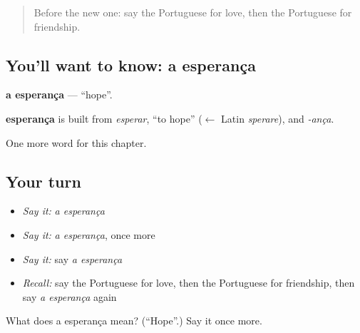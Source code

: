 \label{lesson:PT-C149-esperanca}



\begin{quote}
Before the new one: say the Portuguese for love, then the Portuguese for friendship.
\end{quote}

\subsection*{You'll want to know: a esperança}
\textbf{a esperança} — \textquotedblleft{}hope\textquotedblright{}.

\begin{cousinweb}
\textbf{esperança} is built from \emph{esperar}, \textquotedblleft{}to hope\textquotedblright{} ($\leftarrow$ Latin \emph{sperare}), and \emph{-ança}.
\end{cousinweb}

\begin{grammarlens}[title={What you've built}]
One more word for this chapter.
\end{grammarlens}

\subsection*{Your turn}
\begin{itemize}
\raggedright
  \item \emph{Say it:} \emph{a esperança}
  \item \emph{Say it:} \emph{a esperança}, once more
  \item \emph{Say it:} say \emph{a esperança}
  \item \emph{Recall:} say the Portuguese for love, then the Portuguese for friendship, then say \emph{a esperança} again
\end{itemize}

\begin{tcolorbox}[breakable,colback=teal!4,colframe=teal!35!black,title={Before you move on}]
What does a esperança mean? (\textquotedblleft{}Hope\textquotedblright{}.) Say it once more.
\end{tcolorbox}
